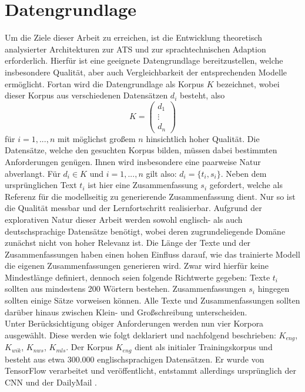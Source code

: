 \chapter{Datengrundlage}
\thispagestyle{fancy}
\label{chap:Datengrundlage}

\noindent
Um die Ziele dieser Arbeit zu erreichen, ist die Entwicklung theoretisch analysierter Architekturen zur \ac{ATS} und zur sprachtechnischen Adaption erforderlich. Hierfür ist eine geeignete Datengrundlage bereitzustellen, welche insbesondere Qualität, aber auch Vergleichbarkeit der entsprechenden Modelle ermöglicht. Fortan wird die Datengrundlage als Korpus $K$ bezeichnet, wobei dieser Korpus aus verschiedenen Datensätzen $d_i$ besteht, also $$K=\begin{pmatrix} d_1 \\ \vdots \\ d_n \end{pmatrix}$$ für $i=1,...,n$ mit möglichst großem $n$ hinsichtlich hoher Qualität. Die Datensätze, welche den gesuchten Korpus bilden, müssen dabei bestimmten Anforderungen genügen. Ihnen wird insbesondere eine paarweise Natur abverlangt. Für $d_i \in K$ und $i=1,...,n$ gilt also: $d_i=\{t_i,s_i\}$. Neben dem ursprünglichen Text $t_i$ ist hier eine Zusammenfassung $s_i$ gefordert, welche als Referenz für die modellseitig zu generierende Zusammenfassung dient. Nur so ist die Qualität messbar und der Lernfortschritt realisierbar. Aufgrund der explorativen Natur dieser Arbeit werden sowohl englisch- als auch deutschsprachige Datensätze benötigt, wobei deren zugrundeliegende Domäne zunächst nicht von hoher Relevanz ist. Die Länge der Texte und der Zusammenfassungen haben einen hohen Einfluss darauf, wie das trainierte Modell die eigenen Zusammenfassungen generieren wird. Zwar wird hierfür keine Mindestlänge definiert, dennoch seien folgende Richtwerte gegeben: Texte $t_i$ sollten aus mindestens 200 Wörtern bestehen. Zusammenfassungen $s_i$ hingegen sollten einige Sätze vorweisen können. Alle Texte und Zusammenfassungen sollten darüber hinaus zwischen Klein- und Großschreibung unterscheiden.\\

\noindent
Unter Berücksichtigung obiger Anforderungen werden nun vier Korpora ausgewählt. Diese werden wie folgt deklariert und nachfolgend beschrieben: $K_{eng}$, $K_{wik}$, $K_{nws}$, $K_{mls}$. Der Korpus $K_{eng}$ dient als initialer Trainingskorpus und besteht aus etwa 300.000 englischsprachigen Datensätzen. Er wurde von TensorFlow verarbeitet und veröffentlicht, entstammt allerdings ursprünglich der CNN und der DailyMail \cite{TEN21}.\\

